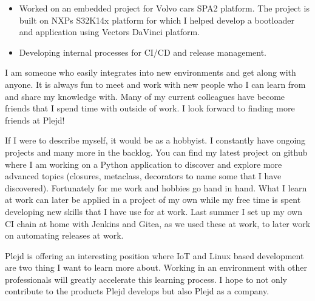 \documentclass[10pt,a4paper,ragged2e,withhyper]{altacv}
\begin{document}
\begin{paracol}{2}

\begin{itemize}
\item Worked on an embedded project for Volvo cars SPA2 platform. The project is 
built on NXPs S32K14x platform for which I helped develop a bootloader and application using Vectors 
DaVinci platform.
\item Developing internal processes for CI/CD and release management. 
\end{itemize}


I am someone who easily integrates into new environments and get along with anyone. 
It is always fun to meet and work with new people who I can learn from and share my knowledge with.
Many of my current colleagues have become friends that I spend time with outside of work. I look
forward to finding more friends at Plejd!
\smallskip

If I were to describe myself, it would be as a hobbyist. I constantly have ongoing projects and many more in
the backlog. You can find my latest project on github where I am working on a Python application to 
discover and explore more advanced topics (closures, metaclass, decorators to name some that I have discovered).
Fortunately for me work and hobbies go hand in hand. What I learn at work can later be applied in a project 
of my own while my free time is spent developing new skills that I have use for at work. Last summer 
I set up my own CI chain at home with Jenkins and Gitea, as we used these at work, to later work on 
automating releases at work.
\smallskip

Plejd is offering an interesting position where IoT and Linux based development are two thing I want to
learn more about. Working in an environment with other professionals will greatly accelerate this learning 
process. I hope to not only contribute to the products Plejd develops but also Plejd as a company.

\medskip


\switchcolumn


\end{paracol}
\end{document}
